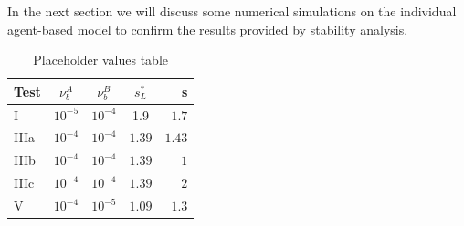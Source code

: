 In the next section we will discuss some numerical simulations on the individual agent-based model to confirm the results provided by stability analysis.




	\begin{table}[h]
	\begin{tabular}{ l |c|c|c| r }
	\hline
		Test & $\nu_b^{A}$ & $\nu_b^{B}$ & $s^{*}_{L}$ & s \\ 
		\hline
		I &  $10^{-5}$ & $10^{-4} $ & 1.9 & $1.7$ \\ 
		IIIa & $10^{-4}$  & $10^{-4}$ & $1.39$ & $1.43$ \\
		IIIb & $10^{-4}$  & $10^{-4}$ & $1.39$ & $1$ \\
		IIIc & $10^{-4}$  & $10^{-4}$ & $1.39$ & $2$ \\
		V & $10^{-4}$ & $10^{-5}$ & $1.09$ & $1.3$ \\
			\hline
	\end{tabular}

	\caption{Placeholder values table}
	\end{table}







